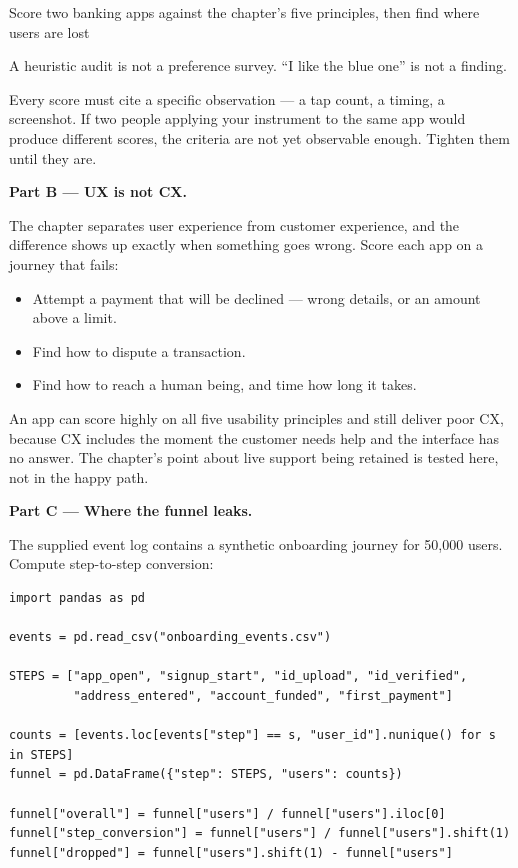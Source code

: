 \begin{labproject}{Score two banking apps against the chapter's five principles, then find where users are lost}
\begin{pitfall}
A heuristic audit is not a preference survey. ``I like the blue one'' is not a finding.

Every score must cite a specific observation --- a tap count, a timing, a screenshot. If two people applying your instrument to the same app would produce different scores, the criteria are not yet observable enough. Tighten them until they are.
\end{pitfall}

\medskip\noindent\textbf{Part B --- UX is not CX.}\par
The chapter separates user experience from customer experience, and the difference shows up exactly when something goes wrong. Score each app on a journey that fails:

\begin{itemize}
  \item Attempt a payment that will be declined --- wrong details, or an amount above a limit.
  \item Find how to dispute a transaction.
  \item Find how to reach a human being, and time how long it takes.
\end{itemize}

An app can score highly on all five usability principles and still deliver poor CX, because CX includes the moment the customer needs help and the interface has no answer. The chapter's point about live support being retained is tested here, not in the happy path.

\medskip\noindent\textbf{Part C --- Where the funnel leaks.}\par
The supplied event log contains a synthetic onboarding journey for 50{,}000 users. Compute step-to-step conversion:

\begin{lstlisting}[style=mlpython]
import pandas as pd

events = pd.read_csv("onboarding_events.csv")

STEPS = ["app_open", "signup_start", "id_upload", "id_verified",
         "address_entered", "account_funded", "first_payment"]

counts = [events.loc[events["step"] == s, "user_id"].nunique() for s in STEPS]
funnel = pd.DataFrame({"step": STEPS, "users": counts})

funnel["overall"] = funnel["users"] / funnel["users"].iloc[0]
funnel["step_conversion"] = funnel["users"] / funnel["users"].shift(1)
funnel["dropped"] = funnel["users"].shift(1) - funnel["users"]


\end{lstlisting}
\end{labproject}
